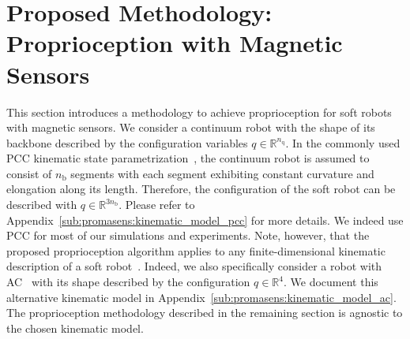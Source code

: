 
\section{Proposed Methodology: Proprioception with Magnetic Sensors}\label{sec:promasens:methodology}

This section introduces a methodology to achieve proprioception for soft robots with magnetic sensors.
%
We consider a continuum robot with the shape of its backbone described by the configuration variables $q \in \mathbb{R}^{n_\mathrm{q}}$.
In the commonly used \gls{PCC} kinematic state parametrization~\citep{webster2010design}, the continuum robot is assumed to consist of $n_\mathrm{b}$ segments with each segment exhibiting constant curvature and elongation along its length. Therefore, the configuration of the soft robot can be described with $q \in \mathbb{R}^{3n_\mathrm{b}}$.
Please refer to Appendix~\ref{sub:promasens:kinematic_model_pcc} for more details.
We indeed use PCC for most of our simulations and experiments.
Note, however, that the proposed proprioception algorithm applies to any finite-dimensional kinematic description of a soft robot~\citep{armanini2023soft}.
Indeed, we also specifically consider a robot with \gls{AC}~\citep{della2020soft, stella2023piecewise} with its shape described by the configuration $q \in \mathbb{R}^4$. We document this alternative kinematic model in Appendix~\ref{sub:promasens:kinematic_model_ac}.
The proprioception methodology described in the remaining section is agnostic to the chosen kinematic model.

